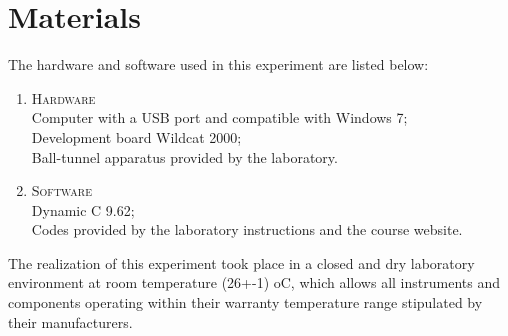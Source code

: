 \section{Materials}

The hardware and software used in this experiment are listed below:

\begin{enumerate}[]
\item \textsc{Hardware} \hfill
\\ Computer with a USB port and compatible with Windows 7;
\\ Development board Wildcat 2000;
\\ Ball-tunnel apparatus provided by the laboratory.
\\
\item \textsc{Software}  \hfill
\\ Dynamic C 9.62;
\\ Codes provided by the laboratory instructions and the course website.
\\
\end{enumerate}

The realization of this experiment took place in a closed and dry laboratory environment at room temperature (26+-1)  oC, which allows all instruments and components operating within their warranty temperature range stipulated by their manufacturers.
